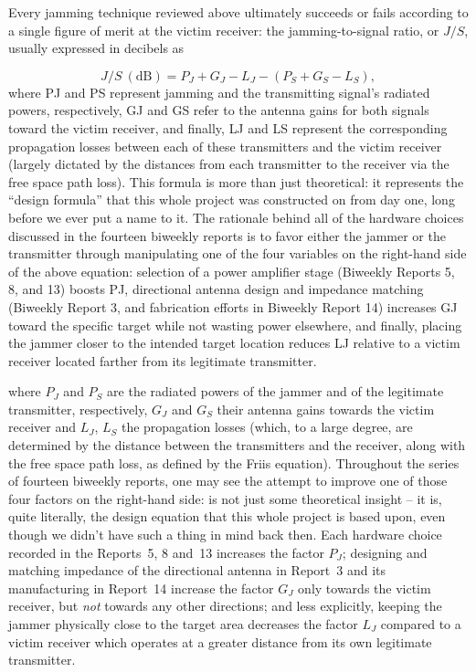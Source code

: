 \documentclass[12pt,a4paper]{report}
\begin{document}
	Every jamming technique reviewed above ultimately succeeds or fails according to a single figure of merit at the victim receiver: the jamming-to-signal ratio, or $J/S$, usually expressed in decibels as
	
	\[
	J/S \ (\text{dB}) = P_J + G_{J} - L_{J} - (P_S + G_S - L_S),
	\]
	where PJ and PS represent jamming and the transmitting signal’s radiated powers, respectively, GJ and GS refer to the antenna gains for both signals toward the victim receiver, and finally, LJ and LS represent the corresponding propagation losses between each of these transmitters and the victim receiver (largely dictated by the distances from each transmitter to the receiver via the free space path loss). This formula is more than just theoretical: it represents the “design formula” that this whole project was constructed on from day one, long before we ever put a name to it. The rationale behind all of the hardware choices discussed in the fourteen biweekly reports is to favor either the jammer or the transmitter through manipulating one of the four variables on the right-hand side of the above equation: selection of a power amplifier stage (Biweekly Reports 5, 8, and 13) boosts PJ, directional antenna design and impedance matching (Biweekly Report 3, and fabrication efforts in Biweekly Report 14) increases GJ toward the specific target while not wasting power elsewhere, and finally, placing the jammer closer to the intended target location reduces LJ relative to a victim receiver located farther from its legitimate transmitter.
	
	\vspace{0.5cm}
	
	where $P_J$ and $P_S$ are the radiated powers of the jammer and of the legitimate transmitter, respectively, $G_J$ and $G_S$ their antenna gains towards the victim receiver and $L_J$, $L_S$ the propagation losses (which, to a large degree, are determined by the distance between the transmitters and the receiver, along with the free space path loss, as defined by the Friis equation). Throughout the series of fourteen biweekly reports, one may see the attempt to improve one of those four factors on the right-hand side: is not just some theoretical insight -- it is, quite literally, the design equation that this whole project is based upon, even though we didn't have such a thing in mind back then. Each hardware choice recorded in the Reports~5, 8 and~13 increases the factor $P_J$; designing and matching impedance of the directional antenna in Report~3 and its manufacturing in Report~14 increase the factor $G_J$ only towards the victim receiver, but \emph{not} towards any other directions; and less explicitly, keeping the jammer physically close to the target area decreases the factor $L_J$ compared to a victim receiver which operates at a greater distance from its own legitimate transmitter.
	
\end{document}
